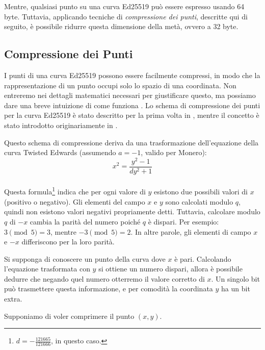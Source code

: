 Mentre, qualsiasi punto su una curva Ed25519 può essere espresso usando 64 byte. Tuttavia, applicando tecniche di {\em compressione dei punti}, descritte qui di seguito, è possibile ridurre questa dimensione della metà, ovvero a 32 byte.


\subsection{Compressione dei Punti}
\label{point_compression_section}

I punti di una curva Ed25519 possono essere facilmente compressi, in modo che la rappresentazione di un punto occupi solo lo spazio di una coordinata. Non entreremo nei dettagli matematici necessari per giustificare questo, ma possiamo dare una breve intuizione di come funziona \cite{eddsa-ed25519-irtf}. Lo schema di compressione dei punti per la curva Ed25519 è stato descritto per la prima volta in \cite{Bernstein2012}, mentre il concetto è stato introdotto originariamente in \cite{Miller:point-compression-origin}.

Questo schema di compressione deriva da una trasformazione dell’equazione della curva Twisted Edwards (assumendo \(a = -1\), valido per Monero):\vspace{0.175cm} 
\[x^2 = \frac{y^2 - 1}{d y^2 + 1}\]\\
Questa formula\footnote{\(d = - \frac{121665}{121666}\), in questo caso.} indica che per ogni valore di \(y\) esistono due possibili valori di \(x\) (positivo o negativo). Gli elementi del campo \(x\) e \(y\) sono calcolati modulo \(q\), quindi non esistono valori negativi propriamente detti. Tuttavia, calcolare modulo \(q\) di \(-x\) cambia la parità del numero poiché \(q\) è dispari. Per esempio: \(3 \pmod{5} = 3\), mentre \(-3 \pmod{5} = 2\). In altre parole, gli elementi di campo \(x\) e \(-x\) differiscono per la loro parità.

Si supponga di conoscere un punto della curva dove \(x\) è pari. Calcolando l’equazione trasformata con \(y\) si ottiene un numero dispari, allora è possibile dedurre che negando quel numero otterremo il valore corretto di \(x\). Un singolo bit può trasmettere questa informazione, e per comodità la coordinata \(y\) ha un bit extra.

Supponiamo di voler comprimere il punto \((x, y)\).

